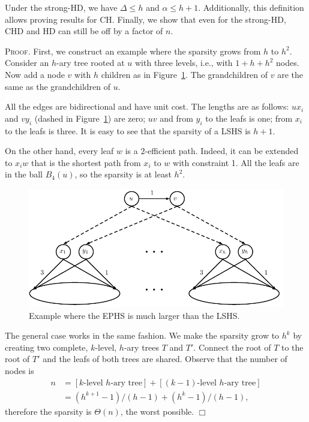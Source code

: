 \documentclass[opre,nonblindrev]{informs3} %
\renewenvironment{proof}[1][\textsc{Proof.}]{#1 }{\hfill $\Box$}
\begin{document}
\begin{APPENDICES}
Under the strong-HD, we have  $\Delta\leq h$ and $\alpha\leq h+1$.
Additionally, this definition allows proving results for CH.
Finally, we show that even for the strong-HD, CHD and HD can still be off by a factor of $n$.

\begin{proof}
First, we construct an example where the sparsity grows from $h$ to $h^2$.
Consider an $h$-ary tree rooted at $u$ with three levels, i.e., with $1+h+h^2$ nodes.
Now add a node $v$ with $h$ children as in Figure~\ref{fig:treelike}. 
The grandchildren of $v$ are the same as the grandchildren of $u$.

All the edges are bidirectional and have unit cost.
The lengths are as follows: $ux_i$ and $vy_i$ (dashed in Figure~\ref{fig:treelike}) are zero; $uv$ and from $y_i$ to the leafs is one; from $x_i$ to the leafs is three.
It is easy to see that the sparsity of a LSHS is $h+1$.

On the other hand, every leaf $w$ is a $2$-efficient path.
Indeed, it can be extended to $x_iw$ that is the shortest path from $x_i$ to $w$ with constraint 1.
All the leafs are in the ball $B_4(u)$, so the sparsity is at least $h^2$.

\begin{figure}
\centering
\includegraphics[scale=0.5]{TexImg/Treelike.pdf}
\caption{Example where the EPHS is much larger than the LSHS.}\label{fig:treelike}
\end{figure}

The general case works in the same fashion.
We make the sparsity grow to $h^k$ by creating two complete, $k$-level, $h$-ary trees $T$ and $T'$.
Connect the root of $T$ to the root of $T'$ and the leafs of both trees are shared.
Observe that the number of nodes is 
\begin{align*}
n &=[\text{$k$-level $h$-ary tree}] + [\text{$(k-1)$-level $h$-ary tree}]\\
&= ({h^{k+1}-1})/({h-1}) + ({h^k-1})/({h-1}),
\end{align*}
therefore the sparsity is $\Theta(n)$, the worst possible.
\end{proof}


\end{APPENDICES}
\end{document}
